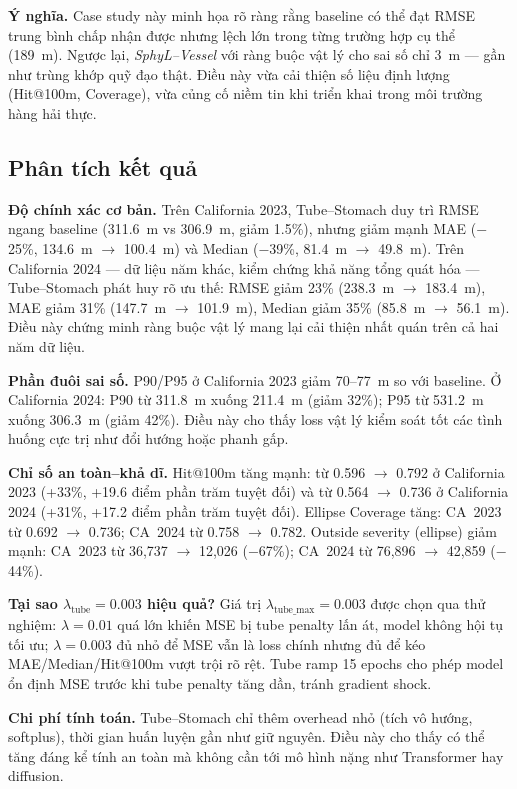 \documentclass{IEEEtran}
\begin{document}
\medskip
\noindent \textbf{Ý nghĩa.}
Case study này minh họa rõ ràng rằng baseline có thể đạt RMSE trung bình chấp nhận được
nhưng lệch lớn trong từng trường hợp cụ thể (189~m).
Ngược lại, \emph{SphyL--Vessel} với ràng buộc vật lý cho sai số chỉ 3~m ---
gần như trùng khớp quỹ đạo thật.
Điều này vừa cải thiện số liệu định lượng (Hit@100m, Coverage),
vừa củng cố niềm tin khi triển khai trong môi trường hàng hải thực.

\subsection{Phân tích kết quả}

\textbf{Độ chính xác cơ bản.}
Trên California 2023, Tube--Stomach duy trì RMSE ngang baseline
(311.6~m vs 306.9~m, giảm 1.5\%),
nhưng giảm mạnh MAE ($-$25\%, 134.6~m $\to$ 100.4~m)
và Median ($-$39\%, 81.4~m $\to$ 49.8~m).
Trên California 2024 --- dữ liệu năm khác, kiểm chứng khả năng tổng quát hóa ---
Tube--Stomach phát huy rõ ưu thế:
RMSE giảm 23\% (238.3~m $\to$ 183.4~m),
MAE giảm 31\% (147.7~m $\to$ 101.9~m),
Median giảm 35\% (85.8~m $\to$ 56.1~m).
Điều này chứng minh ràng buộc vật lý mang lại cải thiện nhất quán
trên cả hai năm dữ liệu.

\textbf{Phần đuôi sai số.}
P90/P95 ở California 2023 giảm 70--77~m so với baseline.
Ở California 2024: P90 từ 311.8~m xuống 211.4~m (giảm 32\%);
P95 từ 531.2~m xuống 306.3~m (giảm 42\%).
Điều này cho thấy loss vật lý kiểm soát tốt các tình huống cực trị
như đổi hướng hoặc phanh gấp.

\textbf{Chỉ số an toàn--khả dĩ.}
Hit@100m tăng mạnh: từ 0.596 $\to$ 0.792 ở California 2023
(+33\%, +19.6 điểm phần trăm tuyệt đối)
và từ 0.564 $\to$ 0.736 ở California 2024
(+31\%, +17.2 điểm phần trăm tuyệt đối).
Ellipse Coverage tăng: CA~2023 từ 0.692 $\to$ 0.736;
CA~2024 từ 0.758 $\to$ 0.782.
Outside severity (ellipse) giảm mạnh:
CA~2023 từ 36{,}737 $\to$ 12{,}026 ($-$67\%);
CA~2024 từ 76{,}896 $\to$ 42{,}859 ($-$44\%).

\textbf{Tại sao $\lambda_{\text{tube}}=0.003$ hiệu quả?}
Giá trị $\lambda_{\text{tube\_max}}=0.003$ được chọn qua thử nghiệm:
$\lambda=0.01$ quá lớn khiến MSE bị tube penalty lấn át,
model không hội tụ tối ưu;
$\lambda=0.003$ đủ nhỏ để MSE vẫn là loss chính
nhưng đủ để kéo MAE/Median/Hit@100m vượt trội rõ rệt.
Tube ramp 15 epochs cho phép model ổn định MSE trước khi tube penalty tăng dần,
tránh gradient shock.

\textbf{Chi phí tính toán.}
Tube--Stomach chỉ thêm overhead nhỏ (tích vô hướng, softplus),
thời gian huấn luyện gần như giữ nguyên.
Điều này cho thấy có thể tăng đáng kể tính an toàn mà không cần tới
mô hình nặng như Transformer hay diffusion.
\end{document}
